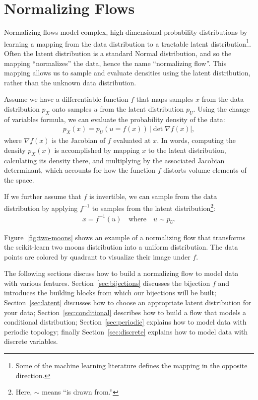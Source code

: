 \documentclass[twocolumn,twocolappendix]{aastex631}
\newcommand{\px}{p^{}_{X}}
\newcommand{\pu}{p^{}_{U}}
\begin{document}
\section{Normalizing Flows}
\label{sec:nf}

Normalizing flows model complex, high-dimensional probability distributions by learning a mapping from the data distribution to a tractable latent distribution\footnote{Some of the machine learning literature defines the mapping in the opposite direction.}.
Often the latent distribution is a standard Normal distribution, and so the mapping ``normalizes'' the data, hence the name ``normalizing flow''.
This mapping allows us to sample and evaluate densities using the latent distribution, rather than the unknown data distribution.

Assume we have a differentiable function $f$ that maps samples $x$ from the data distribution $\px$ onto samples $u$ from the latent distribution $\pu$.
Using the change of variables formula, we can evaluate the probability density of the data:
\begin{align}
    \px(x) = \pu(u=f(x)) \, |\det \nabla f(x)|,
    \label{eq:px}
\end{align}
where $\nabla f(x)$ is the Jacobian of $f$ evaluated at $x$.
In words, computing the density $\px(x)$ is accomplished by mapping $x$ to the latent distribution, calculating its density there, and multiplying by the associated Jacobian determinant, which accounts for how the function $f$ distorts volume elements of the space.

If we further assume that $f$ is invertible, we can sample from the data distribution by applying $f^{-1}$ to samples from the latent distribution\footnote{Here, $\sim$ means ``is drawn from.''}:
\begin{align}
    x = f^{-1}(u) \quad \text{where} \quad u \sim \pu.
\end{align}

Figure~\ref{fig:two-moons} shows an example of a normalizing flow that transforms the scikit-learn \citep{sklearn} two moons distribution into a uniform distribution.
The data points are colored by quadrant to visualize their image under $f$.

The following sections discuss how to build a normalizing flow to model data with various features.
Section~\ref{sec:bijections} discusses the bijection $f$ and introduces the building blocks from which our bijections will be built;
Section~\ref{sec:latent} discusses how to choose an appropriate latent distribution for your data;
Section~\ref{sec:conditional} describes how to build a flow that models a conditional distribution;
Section~\ref{sec:periodic} explains how to model data with periodic topology;
finally Section~\ref{sec:discrete} explains how to model data with discrete variables.
\end{document}
